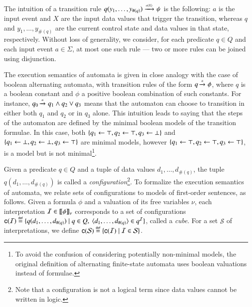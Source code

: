 \documentclass{llncs}
\begin{document}
The intuition of a transition rule \(q(y_1,\ldots,y_{\#(q)})
\xrightarrow{{\scriptscriptstyle a(X)}}_{{\scriptstyle }} \psi\) is the following: $a$ is the input event and $X$
are the input data values that trigger the transition, whereas $q$ and
$y_1,\ldots,y_{\#(q)}$ are the current control state and data values
in that state, respectively. Without loss of generality, we consider,
for each predicate $q \in Q$ and each input event $a \in \Sigma$, at
most one such rule --- two or more rules can be joined using
disjunction. 

The execution semantics of automata is given in close analogy with the
case of boolean alternating automata, with transition rules of the
form $q \xrightarrow{{\scriptscriptstyle a}}_{{\scriptstyle }} \phi$, where $q$ is a boolean constant and $\phi$
a positive boolean combination of such constants. For instance, $q_0
\xrightarrow{{\scriptscriptstyle a}}_{{\scriptstyle }} q_1 \wedge q_2 \vee q_3$ means that the automaton can
choose to transition in either both $q_1$ and $q_2$ or in $q_3$
alone. This intuition leads to saying that the steps of the automaton
are defined by the minimal boolean models of the transition
formulae. In this case, both $\{ q_1 \leftarrow \top, q_2 \leftarrow
  \top, q_3 \leftarrow \bot \}$ and $\{ q_1 \leftarrow \bot, q_2
  \leftarrow \bot, q_3 \leftarrow \top \}$ are minimal models, however
$\{ q_1 \leftarrow \top, q_2 \leftarrow \top, q_3 \leftarrow \top \}$,
is a model but is not minimal\footnote{To avoid the confusion of
  considering potentially non-minimal models, the original definition
  of alternating finite-state automata \cite{ChandraKozenStockmeyer81}
  uses boolean valuations instead of formulae.}.

Given a predicate $q \in Q$ and a tuple of data values
$d_1,\ldots,d_{\#(q)}$, the tuple $q(d_1,\ldots,d_{\#(q)})$ is called
a \emph{configuration}\footnote{Note that a configuration is not a
  logical term since data values cannot be written in logic.}. To
formalize the execution semantics of automata, we relate sets of
configurations to models of first-order sentences, as follows. Given a
formula $\phi$ and a valuation of its free variables $\nu$, each
interpretation $\mathcal{I} \in {\bf [\![} \phi {\bf ]\!]}_\nu$ corresponds to a set of
configurations $\mathsf{c}({\mathcal{I}}) \stackrel{\scriptscriptstyle{\mathsf{def}}}{=} \{ q(d_1,\ldots,d_{\#(q)}) \mid q
  \in Q,~ \langle d_1,\ldots,d_{\#(q)} \rangle \in q^{\mathcal{I}} \}$, called a
\emph{cube}. For a set $\mathcal{S}$ of interpretations, we define
$\mathsf{c}({\mathcal{S}}) \stackrel{\scriptscriptstyle{\mathsf{def}}}{=} \{ \mathsf{c}({\mathcal{I}}) \mid \mathcal{I} \in
  \mathcal{S} \}$. 
\end{document}
